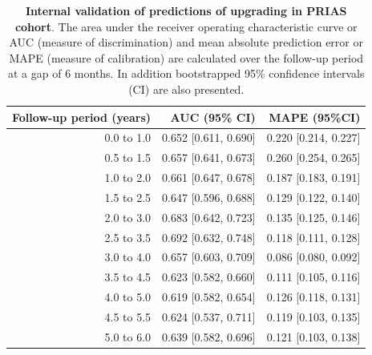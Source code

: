 \begin{table}[!htb]
\small\sf\centering
\caption{\textbf{Internal validation of predictions of upgrading in PRIAS cohort}. The area under the receiver operating characteristic curve or AUC (measure of discrimination) and mean absolute prediction error or MAPE (measure of calibration) are calculated over the follow-up period at a gap of 6 months. In addition bootstrapped 95\% confidence intervals (CI) are also presented.}
\label{tab:AUC_PE_PRIAS}
\begin{tabular}{r|r|r}
\hline
\hline
Follow-up period (years) & AUC (95\% CI) & MAPE (95\%CI)\\ 
\hline
0.0 to 1.0 & 0.652 [0.611, 0.690] & 0.220 [0.214, 0.227]\\
0.5 to 1.5 & 0.657 [0.641, 0.673] & 0.260 [0.254, 0.265]\\
1.0 to 2.0 & 0.661 [0.647, 0.678] & 0.187 [0.183, 0.191]\\
1.5 to 2.5 & 0.647 [0.596, 0.688] & 0.129 [0.122, 0.140]\\
2.0 to 3.0 & 0.683 [0.642, 0.723] & 0.135 [0.125, 0.146]\\
2.5 to 3.5 & 0.692 [0.632, 0.748] & 0.118 [0.111, 0.128]\\
3.0 to 4.0 & 0.657 [0.603, 0.709] & 0.086 [0.080, 0.092]\\
3.5 to 4.5 & 0.623 [0.582, 0.660] & 0.111 [0.105, 0.116]\\
4.0 to 5.0 & 0.619 [0.582, 0.654] & 0.126 [0.118, 0.131]\\
4.5 to 5.5 & 0.624 [0.537, 0.711] & 0.119 [0.103, 0.135]\\
5.0 to 6.0 & 0.639 [0.582, 0.696] & 0.121 [0.103, 0.138]\\
\hline
\end{tabular}	
\end{table}

